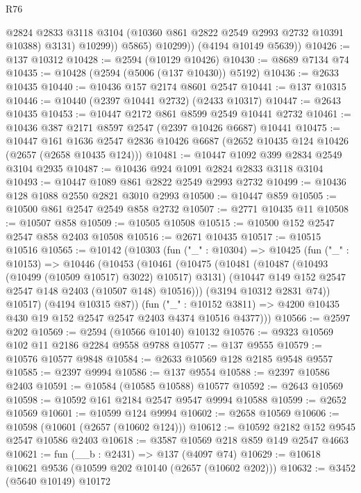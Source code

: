 \begin{lexlean}{R76}
\begin{coremodule}
                  @2824
                  @2833
                  @3118
                  @3104
                  (@10360 @861 @2822 @2549 @2993 @2732 @10391 @10388)
                  @3131)
                @10299))
            @5865)
          @10299))
      (@4194 @10149 @5639))
@10426 := @137 @10312
@10428 := @2594 (@10129 @10426)
@10430 := @8689 @7134 @74
@10435 := @10428 (@2594 (@5006 (@137 @10430)) @5192)
@10436 := @2633 @10435
@10440 := @10436 @157 @2174 @8601 @2547
@10441 := @137 @10315
@10446 := @10440 (@2397 @10441 @2732) (@2433 @10317)
@10447 := @2643 @10435
@10453 := @10447 @2172 @861 @8599 @2549 @10441 @2732
@10461 := @10436 @387 @2171 @8597 @2547 (@2397 @10426 @6687) @10441
@10475 := @10447
    @161
    @1636
    @2547
    @2836
    @10426
    @6687
    (@2652 @10435 @124 @10426 (@2657 (@2658 @10435 @124)))
@10481 := @10447 @1092 @399 @2834 @2549 @3104 @2935
@10487 := @10436 @924 @1091 @2824 @2833 @3118 @3104
@10493 := @10447 @1089 @861 @2822 @2549 @2993 @2732
@10499 := @10436 @128 @1088 @2550 @2821 @3010 @2993
@10500 := @10447 @859
@10505 := @10500 @861 @2547 @2549 @858 @2732
@10507 := @2771 @10435 @11
@10508 := @10507 @858
@10509 := @10505 @10508
@10515 := @10500 @152 @2547 @2547 @858 @2403 @10508
@10516 := @2671 @10435
@10517 := @10515 @10516
@10565 := @10142
    (@10303
      (fun ("_" : @10304) =>
      @10425
        (fun ("_" : @10153) =>
        @10446
          (@10453
            (@10461
              (@10475
                (@10481
                  (@10487 (@10493 (@10499 (@10509 @10517) @3022) @10517) @3131)
                  (@10447 @149 @152 @2547 @2547 @148 @2403 (@10507 @148) @10516)))
              (@3194 @10312 @2831 @74))
            @10517)
          (@4194 @10315 @87))
        (fun ("_" : @10152 @3811) =>
        @4200 @10435 @430 @19 @152 @2547 @2547 @2403 @4374 @10516 @4377)))
@10566 := @2597 @202
@10569 := @2594 (@10566 @10140) @10132
@10576 := @9323 @10569 @102 @11 @2186 @2284 @9558 @9788
@10577 := @137 @9555
@10579 := @10576 @10577 @9848
@10584 := @2633 @10569 @128 @2185 @9548 @9557
@10585 := @2397 @9994
@10586 := @137 @9554
@10588 := @2397 @10586 @2403
@10591 := @10584 (@10585 @10588) @10577
@10592 := @2643 @10569
@10598 := @10592 @161 @2184 @2547 @9547 @9994 @10588
@10599 := @2652 @10569
@10601 := @10599 @124 @9994
@10602 := @2658 @10569
@10606 := @10598 (@10601 (@2657 (@10602 @124)))
@10612 := @10592 @2182 @152 @9545 @2547 @10586 @2403
@10618 := @3587 @10569 @218 @859 @149 @2547 @4663
@10621 := fun (__b : @2431) => @137 (@4097 @74)
@10629 := @10618 @10621 @9536 (@10599 @202 @10140 (@2657 (@10602 @202)))
@10632 := @3452 (@5640 @10149) @10172

\end{coremodule}
\end{lexlean}
